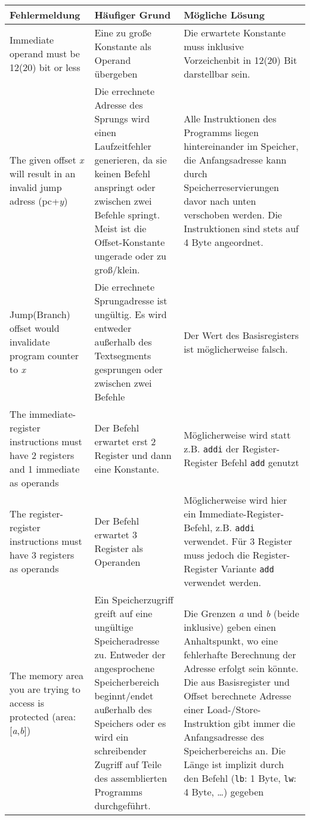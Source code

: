 \begin{tabular}{p{5cm} p{5cm} p{5cm}}

  \textbf{Fehlermeldung} & \textbf{Häufiger Grund} & \textbf{Mögliche Lösung}\\
  \toprule

	Immediate operand must be 12(20) bit or less & Eine zu große Konstante als Operand übergeben & Die erwartete Konstante muss inklusive Vorzeichenbit in 12(20) Bit darstellbar sein.\\

	The given offset \emph{x} will result in an invalid jump adress (pc+\emph{y}) &
	Die errechnete Adresse des Sprungs wird einen Laufzeitfehler generieren, da sie keinen Befehl anspringt oder zwischen zwei Befehle springt. Meist ist die Offset-Konstante ungerade oder zu groß/klein. & Alle Instruktionen des Programms liegen hintereinander im Speicher, die Anfangsadresse kann durch Speicherreservierungen davor nach unten verschoben werden. Die Instruktionen sind stets auf 4 Byte angeordnet.\\

	Jump(Branch) offset would invalidate program counter to \emph{x} & Die errechnete Sprungadresse ist ungültig. Es wird entweder außerhalb des Textsegments gesprungen oder zwischen zwei Befehle &
	Der Wert des Basisregisters ist möglicherweise falsch.\\

	The immediate-register instructions must have 2 registers and 1 immediate as operands & Der Befehl erwartet erst 2 Register und dann eine Konstante. & Möglicherweise wird statt z.B. \texttt{addi} der Register-Register Befehl \texttt{add} genutzt\\

	The register-register instructions must have 3 registers as operands & Der Befehl erwartet 3 Register als Operanden& Möglicherweise wird hier ein Immediate-Register-Befehl, z.B. \texttt{addi} verwendet. Für 3 Register muss jedoch die Register-Register Variante \texttt{add} verwendet werden.\\

	The memory area you are trying to access is protected (area: [\emph{a},\emph{b}]) & Ein Speicherzugriff greift auf eine ungültige Speicheradresse zu. Entweder der angesprochene Speicherbereich beginnt/endet außerhalb des Speichers oder es wird ein schreibender Zugriff auf Teile des assemblierten Programms durchgeführt. & Die Grenzen \emph{a} und \emph{b} (beide inklusive) geben einen Anhaltspunkt, wo eine fehlerhafte Berechnung der Adresse erfolgt sein könnte. Die aus Basisregister und Offset berechnete Adresse einer Load-/Store-Instruktion gibt immer die Anfangsadresse des Speicherbereichs an. Die Länge ist implizit durch den Befehl (\texttt{lb}: 1 Byte, \texttt{lw}: 4 Byte, \dots) gegeben\\

\end{tabular}
